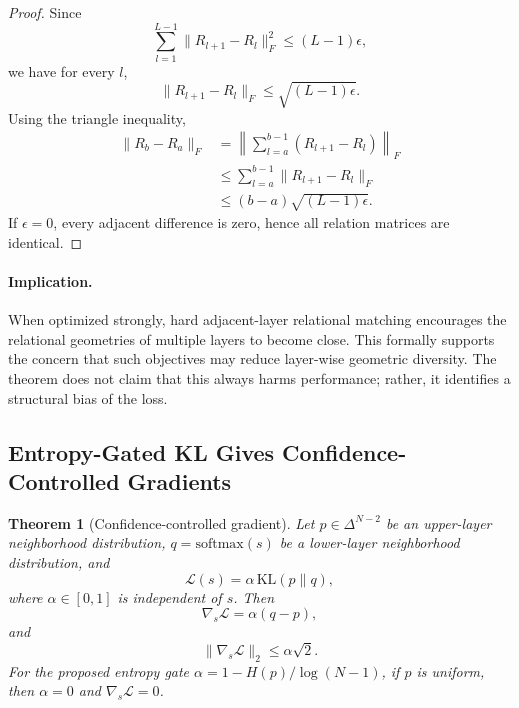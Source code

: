 \documentclass[letterpaper]{article}
\newtheorem{theorem}{Theorem}
\begin{document}
\begin{proof}
Since
\begin{equation}
    \sum_{l=1}^{L-1}\|R_{l+1}-R_l\|_F^2 \leq (L-1)\epsilon,
\end{equation}
we have for every $l$,
\begin{equation}
    \|R_{l+1}-R_l\|_F \leq \sqrt{(L-1)\epsilon}.
\end{equation}
Using the triangle inequality,
\begin{align}
    \|R_b-R_a\|_F
    &=
    \left\|\sum_{l=a}^{b-1}(R_{l+1}-R_l)\right\|_F \\
    &\leq
    \sum_{l=a}^{b-1}\|R_{l+1}-R_l\|_F \\
    &\leq
    (b-a)\sqrt{(L-1)\epsilon}.
\end{align}
If $\epsilon=0$, every adjacent difference is zero, hence all relation matrices are identical.
\end{proof}

\paragraph{Implication.}
When optimized strongly, hard adjacent-layer relational matching encourages the relational geometries of multiple layers to become close. This formally supports the concern that such objectives may reduce layer-wise geometric diversity. The theorem does not claim that this always harms performance; rather, it identifies a structural bias of the loss.

\subsection{Entropy-Gated KL Gives Confidence-Controlled Gradients}

\begin{theorem}[Confidence-controlled gradient]
Let $p\in\Delta^{N-2}$ be an upper-layer neighborhood distribution, $q=\mathrm{softmax}(s)$ be a lower-layer neighborhood distribution, and
\begin{equation}
    \mathcal{L}(s)=\alpha\,\mathrm{KL}(p\|q),
\end{equation}
where $\alpha\in[0,1]$ is independent of $s$. Then
\begin{equation}
    \nabla_s\mathcal{L}=\alpha(q-p),
\end{equation}
and
\begin{equation}
    \|\nabla_s\mathcal{L}\|_2\leq \alpha\sqrt{2}.
\end{equation}
For the proposed entropy gate $\alpha=1-H(p)/\log(N-1)$, if $p$ is uniform, then $\alpha=0$ and $\nabla_s\mathcal{L}=0$.
\end{theorem}
\end{document}
